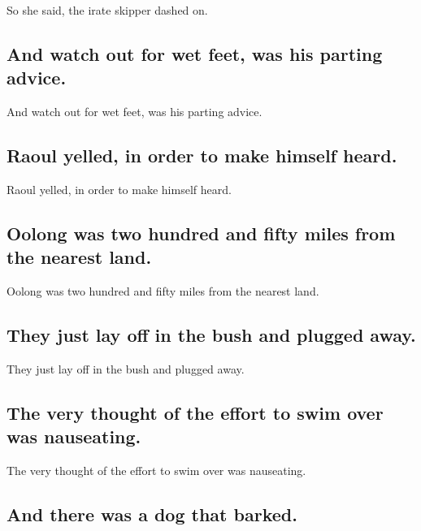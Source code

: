 \documentclass[]{article}
\begin{document}
So she said, the irate skipper dashed on.

\hypertarget{and-watch-out-for-wet-feet-was-his-parting-advice.}{%
\subsection{And watch out for wet feet, was his parting
advice.}\label{and-watch-out-for-wet-feet-was-his-parting-advice.}}

And watch out for wet feet, was his parting advice.

\hypertarget{raoul-yelled-in-order-to-make-himself-heard.}{%
\subsection{Raoul yelled, in order to make himself
heard.}\label{raoul-yelled-in-order-to-make-himself-heard.}}

Raoul yelled, in order to make himself heard.

\hypertarget{oolong-was-two-hundred-and-fifty-miles-from-the-nearest-land.}{%
\subsection{Oolong was two hundred and fifty miles from the nearest
land.}\label{oolong-was-two-hundred-and-fifty-miles-from-the-nearest-land.}}

Oolong was two hundred and fifty miles from the nearest land.

\hypertarget{they-just-lay-off-in-the-bush-and-plugged-away.}{%
\subsection{They just lay off in the bush and plugged
away.}\label{they-just-lay-off-in-the-bush-and-plugged-away.}}

They just lay off in the bush and plugged away.

\hypertarget{the-very-thought-of-the-effort-to-swim-over-was-nauseating.}{%
\subsection{The very thought of the effort to swim over was
nauseating.}\label{the-very-thought-of-the-effort-to-swim-over-was-nauseating.}}

The very thought of the effort to swim over was nauseating.

\hypertarget{and-there-was-a-dog-that-barked.}{%
\subsection{And there was a dog that
barked.}\label{and-there-was-a-dog-that-barked.}}
\end{document}
